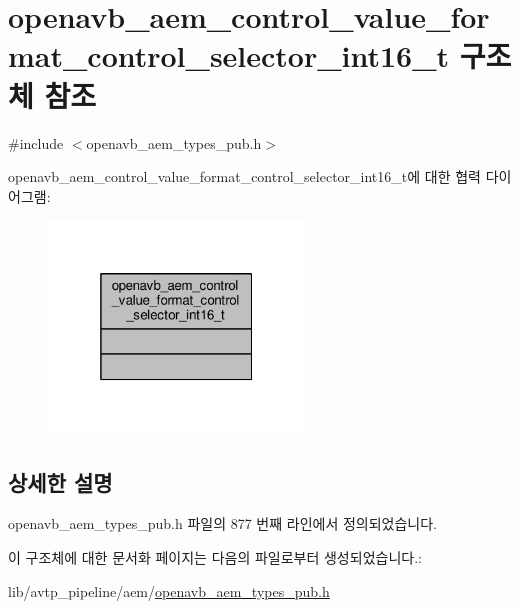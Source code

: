 \hypertarget{structopenavb__aem__control__value__format__control__selector__int16__t}{}\section{openavb\+\_\+aem\+\_\+control\+\_\+value\+\_\+format\+\_\+control\+\_\+selector\+\_\+int16\+\_\+t 구조체 참조}
\label{structopenavb__aem__control__value__format__control__selector__int16__t}


{\ttfamily \#include $<$openavb\+\_\+aem\+\_\+types\+\_\+pub.\+h$>$}



openavb\+\_\+aem\+\_\+control\+\_\+value\+\_\+format\+\_\+control\+\_\+selector\+\_\+int16\+\_\+t에 대한 협력 다이어그램\+:
\nopagebreak
\begin{figure}[H]
\begin{center}
\leavevmode
\includegraphics[width=193pt]{structopenavb__aem__control__value__format__control__selector__int16__t__coll__graph}
\end{center}
\end{figure}


\subsection{상세한 설명}


openavb\+\_\+aem\+\_\+types\+\_\+pub.\+h 파일의 877 번째 라인에서 정의되었습니다.



이 구조체에 대한 문서화 페이지는 다음의 파일로부터 생성되었습니다.\+:\begin{DoxyCompactItemize}
\item 
lib/avtp\+\_\+pipeline/aem/\hyperlink{openavb__aem__types__pub_8h}{openavb\+\_\+aem\+\_\+types\+\_\+pub.\+h}\end{DoxyCompactItemize}
